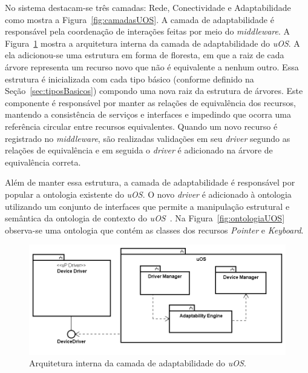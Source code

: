 No sistema destacam-se três camadas: Rede, Conectividade e Adaptabilidade como mostra a Figura~\ref{fig:camadasUOS}. A camada de adaptabilidade é responsável pela coordenação de interações feitas por meio do \emph{middleware}. A Figura~\ref{fig:diagramaDeBlocos} mostra a arquitetura interna da camada de adaptabilidade do \emph{uOS}. A ela adicionou-se uma estrutura em forma de floresta, em que a raiz de cada árvore representa um recurso novo que não é equivalente a nenhum outro. Essa estrutura é inicializada com cada tipo básico (conforme definido na Seção~\ref{sec:tiposBasicos}) compondo uma nova raiz da estrutura de árvores. Este componente é responsável por manter as relações de equivalência dos recursos, mantendo a consistência de serviços e interfaces e impedindo que ocorra uma referência circular entre recursos equivalentes. Quando um novo recurso é registrado no \emph{middleware}, são realizadas validações em seu \emph{driver} segundo as relações de equivalência e em seguida o \emph{driver} é adicionado na árvore de equivalência correta.

Além de manter essa estrutura, a camada de adaptabilidade é responsável por popular a ontologia existente do \emph{uOS}. O novo \emph{driver} é adicionado à ontologia utilizando um conjunto de interfaces que permite a manipulação estrutural e semântica da ontologia de contexto do \emph{uOS}~\cite{ozakisbcup2011}. Na Figura~\ref{fig:ontologiaUOS} observa-se uma ontologia que contém as classes dos recursos \emph{Pointer} e \emph{Keyboard}.

\begin{figure}[ht]
	\center
	\includegraphics[scale=0.6]{imagens/diagramaDeBlocos}
	\caption{Arquitetura interna da camada de adaptabilidade do \emph{uOS}.}
	\label{fig:diagramaDeBlocos}
\end{figure}

